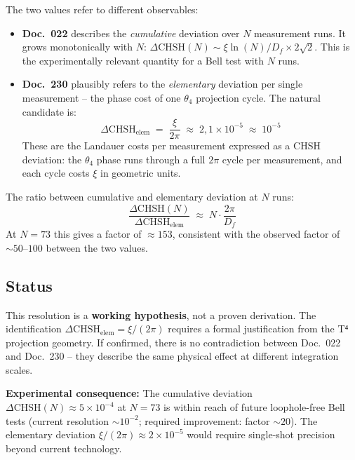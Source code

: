The two values refer to different observables:

\begin{itemize}
  \item \textbf{Doc.~022} describes the \emph{cumulative} deviation over $N$
        measurement runs. It grows monotonically with $N$:
        $\Delta\text{CHSH}(N) \sim \xi\ln(N)/D_f \times 2\sqrt{2}$. This is the
        experimentally relevant quantity for a Bell test with $N$ runs.

  \item \textbf{Doc.~230} plausibly refers to the \emph{elementary} deviation
        per single measurement -- the phase cost of one $\theta_4$ projection
        cycle. The natural candidate is:
        \begin{equation}
          \Delta\text{CHSH}_\text{elem}
          \;=\; \frac{\xi}{2\pi}
          \;\approx\; 2{,}1\times10^{-5}
          \;\approx\; 10^{-5}
          \tag{190.21}
        \end{equation}
        These are the Landauer costs per measurement expressed as a CHSH
        deviation: the $\theta_4$ phase runs through a full $2\pi$ cycle per
        measurement, and each cycle costs $\xi$ in geometric units.
\end{itemize}

The ratio between cumulative and elementary deviation at $N$ runs:
\begin{equation}
  \frac{\Delta\text{CHSH}(N)}{\Delta\text{CHSH}_\text{elem}}
  \;\approx\; N\cdot\frac{2\pi}{D_f}
  \tag{190.22}
\end{equation}
At $N=73$ this gives a factor of $\approx 153$, consistent with the observed
factor of $\sim50$--$100$ between the two values.

\subsection*{Status}

This resolution is a \textbf{working hypothesis}, not a proven derivation. The
identification $\Delta\text{CHSH}_\text{elem} = \xi/(2\pi)$ requires a formal
justification from the T⁴ projection geometry. If confirmed, there is no
contradiction between Doc.~022 and Doc.~230 -- they describe the same physical
effect at different integration scales.

\textbf{Experimental consequence:} The cumulative deviation
$\Delta\text{CHSH}(N) \approx 5\times10^{-4}$ at $N=73$ is within reach of
future loophole-free Bell tests (current resolution $\sim10^{-2}$; required
improvement: factor $\sim20$). The elementary deviation
$\xi/(2\pi) \approx 2\times10^{-5}$ would require single-shot precision beyond
current technology.

